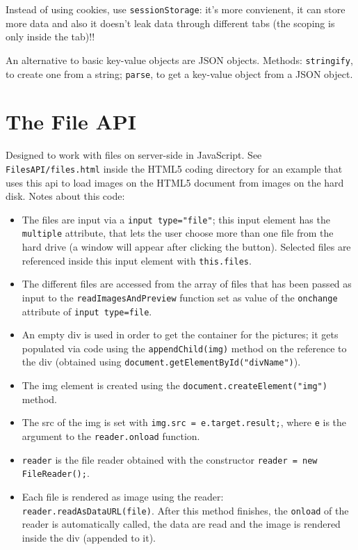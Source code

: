\documentclass[a4paper,11pt]{book}
\begin{document}
Instead of using cookies, use \texttt{sessionStorage}: it's more convienent,
it can store more data and also it doesn't leak data through different tabs
(the scoping is only inside the tab)!!

An alternative to basic key-value objects are JSON objects.
Methods: \texttt{stringify}, to create one from a string; \texttt{parse},
to get a key-value object from a JSON object.

\section{The File API}
Designed to work with files on server-side in JavaScript. See
\texttt{FilesAPI/files.html} inside the HTML5 coding directory for an example
that uses this api to load images on the HTML5 document from images on the
hard disk. Notes about this code:
\begin{itemize}
\item The files are input via a \texttt{input type="file"};
this input element has the \texttt{multiple} attribute, that lets the user choose
more than one file from the hard drive (a window will appear after clicking the
button). Selected files are referenced inside this input element with
\texttt{this.files}.
\item The different files are accessed from the array of files that has been
passed as input to the \texttt{readImagesAndPreview} function set as value
of the \texttt{onchange} attribute of \texttt{input type=file}.
\item An empty div is used in order to get the container for the pictures; it gets
populated via code using the \texttt{appendChild(img)} method on the reference to
the div (obtained using \texttt{document.getElementById("divName")}).
\item The img element is created using the \texttt{document.createElement("img")}
method.
\item The src of the img is set with \texttt{img.src = e.target.result;}, where
\texttt{e} is the argument to the \texttt{reader.onload} function.
\item \texttt{reader} is the file reader obtained with the constructor
\texttt{reader = new FileReader();}.
\item Each file is rendered as image using the reader:
\texttt{reader.readAsDataURL(file)}. After this method finishes, the \texttt{onload}
of the reader is automatically called, the data are read and the image is rendered
inside the div (appended to it).
\end{itemize}
\end{document}
